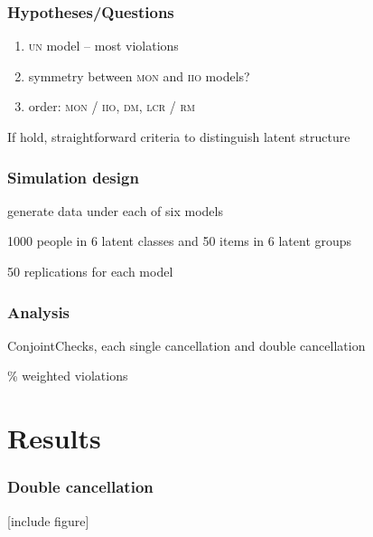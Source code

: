 \documentclass[10pt,serif,professionalfont]{beamer}
\begin{document}
\begin{frame}
    \frametitle{Hypotheses/Questions} %

    \begin{enumerate}
    \item \textsc{un} model -- most violations
    \item symmetry between \textsc{mon} and \textsc{iio} models?
    \item order: \textsc{mon} / \textsc{iio}, \textsc{dm}, \textsc{lcr} / \textsc{rm}
    \end{enumerate}


    If hold, straightforward criteria to distinguish latent structure

\end{frame}

\begin{frame}
    \frametitle{Simulation design}

    generate data under each of six models

    1000 people in 6 latent classes and 50 items in 6 latent groups

    50 replications for each model

\end{frame}

\begin{frame}
    \frametitle{Analysis}

    ConjointChecks, each single cancellation and double cancellation

    \% weighted violations

\end{frame}


\section{Results}

\begin{frame}
    \frametitle{Double cancellation}

    [include figure]

\end{frame}
\end{document}
